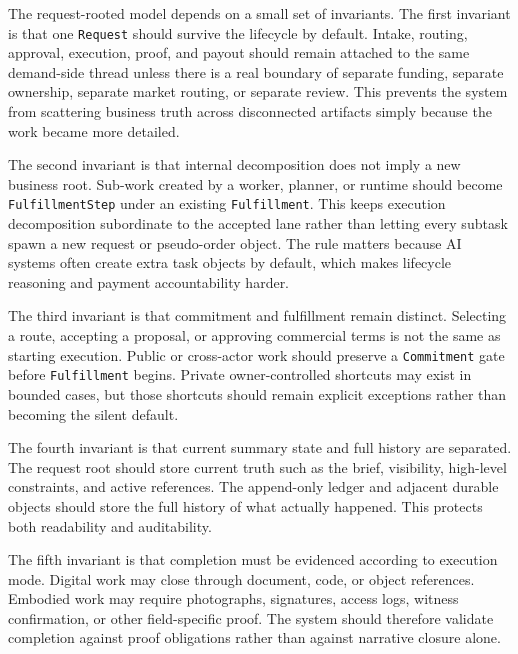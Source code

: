 The request-rooted model depends on a small set of invariants. The first invariant is that one \texttt{Request} should survive the lifecycle by default. Intake, routing, approval, execution, proof, and payout should remain attached to the same demand-side thread unless there is a real boundary of separate funding, separate ownership, separate market routing, or separate review. This prevents the system from scattering business truth across disconnected artifacts simply because the work became more detailed.

The second invariant is that internal decomposition does not imply a new business root. Sub-work created by a worker, planner, or runtime should become \texttt{FulfillmentStep} under an existing \texttt{Fulfillment}. This keeps execution decomposition subordinate to the accepted lane rather than letting every subtask spawn a new request or pseudo-order object. The rule matters because AI systems often create extra task objects by default, which makes lifecycle reasoning and payment accountability harder.

The third invariant is that commitment and fulfillment remain distinct. Selecting a route, accepting a proposal, or approving commercial terms is not the same as starting execution. Public or cross-actor work should preserve a \texttt{Commitment} gate before \texttt{Fulfillment} begins. Private owner-controlled shortcuts may exist in bounded cases, but those shortcuts should remain explicit exceptions rather than becoming the silent default.

The fourth invariant is that current summary state and full history are separated. The request root should store current truth such as the brief, visibility, high-level constraints, and active references. The append-only ledger and adjacent durable objects should store the full history of what actually happened. This protects both readability and auditability.

The fifth invariant is that completion must be evidenced according to execution mode. Digital work may close through document, code, or object references. Embodied work may require photographs, signatures, access logs, witness confirmation, or other field-specific proof. The system should therefore validate completion against proof obligations rather than against narrative closure alone.
